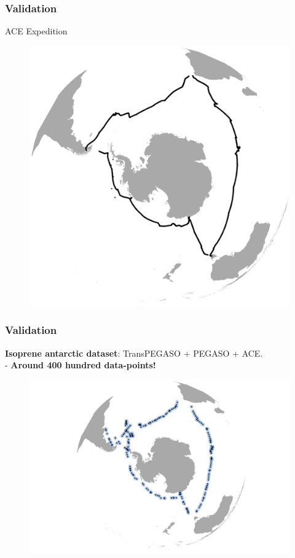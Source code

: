\documentclass{beamer}
\begin{document}
\begin{frame}
\frametitle{Validation}
ACE Expedition
\begin{figure}
\includegraphics[width=0.6\linewidth]{acea.png}
\end{figure}
\end{frame}

\begin{frame}
\frametitle{Validation}
\textbf{Isoprene antarctic dataset}: TransPEGASO + PEGASO + ACE.\\
- \textbf{Around 400 hundred data-points!}
\begin{figure}
\includegraphics[width=0.9\linewidth]{validation_isoprene_roms_bec_ant.png}
\end{figure}
\end{frame}
\end{document}
